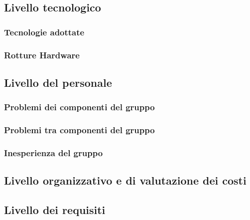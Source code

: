 	\subsection{Livello tecnologico}
	\subsubsection{Tecnologie adottate}
	\subsubsection{Rotture Hardware}
	
	\subsection{Livello del personale}
	\subsubsection{Problemi dei componenti del gruppo}
	\subsubsection{Problemi tra componenti del gruppo}
	\subsubsection{Inesperienza del gruppo}
	
	\subsection{Livello organizzativo e di valutazione dei costi}
	\subsection{Livello dei requisiti}
